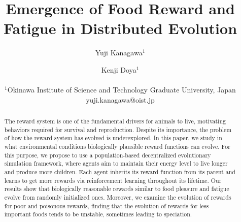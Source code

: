 \documentclass[letterpaper]{article}
\title{Emergence of Food Reward and Fatigue in Distributed Evolution}
\author{
  Yuji Kanagawa$^{1}$ \and
  Kenji Doya$^{1}$ \\
  \mbox{}\\
  $^1$Okinawa Institute of Science and Technology Graduate University, Japan
  yuji.kanagawa@oist.jp
} %
\newcommand{\1}{\mathbb{I} } %
\newcounter{num}
\begin{document}
\maketitle

\begin{abstract}
  The reward system is one of the fundamental drivers for animals to live, motivating behaviors required for survival and reproduction. Despite its importance, the problem of how the reward system has evolved is underexplored. In this paper, we study in what environmental conditions biologically plausible reward functions can evolve. For this purpose, we propose to use a population-based decentralized evolutionary simulation framework, where agents aim to maintain their energy level to live longer and produce more children. Each agent inherits its reward function from its parent and learns to get more rewards via reinforcement learning throughout its lifetime. Our results show that biologically reasonable rewards similar to food pleasure and fatigue evolve from randomly initialized ones. Moreover, we examine the evolution of rewards for poor and poisonous rewards, finding that the evolution of rewards for less important foods tends to be unstable, sometimes leading to speciation.
\end{abstract}




\clearpage




% 
\end{document}
